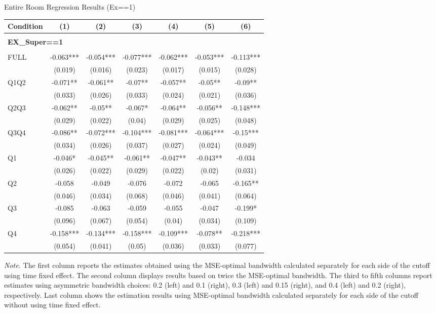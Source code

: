 \begin{table}[]
\TABLE
{Entire Room Regression Results (Ex==1) \label{result_detail1}}{\begin{tabular}{lcccccc}
\hline
Condition & (1) & (2) & (3) & (4) & (5) & (6) \\ \hline
\\ 
\multicolumn{5}{l}{\textbf{EX\_Super==1}} \\ 
\\ 
FULL & -0.063*** & -0.054*** & -0.077*** & -0.062*** & -0.053*** & -0.113*** \\ 
&(0.019)&(0.016) & (0.023)&(0.017)&(0.015)&(0.028)\\ 
Q1Q2 & -0.071** & -0.061** & -0.07** & -0.057** & -0.05** & -0.09** \\ 
&(0.033)&(0.026) & (0.033)&(0.024)&(0.021)&(0.036)\\ 
Q2Q3 & -0.062** & -0.05** & -0.067* & -0.064** & -0.056** & -0.148*** \\ 
&(0.029)&(0.022) & (0.04)&(0.029)&(0.025)&(0.048)\\ 
Q3Q4 & -0.086** & -0.072*** & -0.104*** & -0.081*** & -0.064*** & -0.15*** \\ 
&(0.034)&(0.026) & (0.037)&(0.027)&(0.024)&(0.049)\\ 
Q1 & -0.046* & -0.045** & -0.061** & -0.047** & -0.043** & -0.034 \\ 
&(0.026)&(0.022) & (0.029)&(0.022)&(0.02)&(0.031)\\ 
Q2 & -0.058 & -0.049 & -0.076 & -0.072 & -0.065 & -0.165** \\ 
&(0.046)&(0.034) & (0.068)&(0.046)&(0.041)&(0.064)\\ 
Q3 & -0.085 & -0.063 & -0.059 & -0.055 & -0.047 & -0.199* \\ 
&(0.096)&(0.067) & (0.054)&(0.04)&(0.034)&(0.109)\\ 
Q4 & -0.158*** & -0.134*** & -0.158*** & -0.109*** & -0.078** & -0.218*** \\ 
&(0.054)&(0.041) & (0.05)&(0.036)&(0.033)&(0.077)\\ 
\hline 
\end{tabular}}{\textit{Note.} The first column reports the estimates obtained using the MSE-optimal bandwidth calculated separately for each side of the cutoff using time fixed effect. The second column displays results based on twice the MSE-optimal bandwidth. The third to fifth columns report estimates using asymmetric bandwidth choices: 0.2 (left) and 0.1 (right), 0.3 (left) and 0.15 (right), and 0.4 (left) and 0.2 (right), respectively. Last column shows the estimation results using MSE-optimal bandwidth calculated separately for each side of the cutoff without using time fixed effect.}
\end{table}

